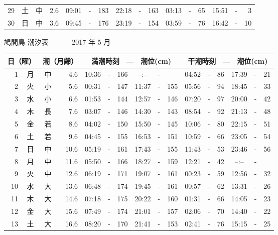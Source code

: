 \documentclass[12pt.a4j]{jsarticle}
\begin{document}
\begin{center}
\begin{table}[ht]
\begin{tabular}{|rc|cr|ccrccr|ccrccr|}
29 & 土 & 中 &  2.6 &  09:01 &-& 183  &  22:18 &-& 163  &   03:13 &-&  65  &   15:51 &-&   3  \\
30 & 日 & 中 &  3.6 &  09:45 &-& 176  &  23:19 &-& 154  &   03:59 &-&  76  &   16:42 &-&  10  \\
   \hline
   \end{tabular}
\end{table}
\newpage
 {\LARGE 鳩間島  潮汐表　　　}
 {\large 2017 年  5 月}\\
 \begin{table}[ht]
    \begin{tabular}{|rc|cr|ccrccr|ccrccr|}
    \hline
    \multicolumn{2}{|c|}{日（曜）} & \multicolumn{2}{c|}{潮（月齢）} & \multicolumn{6}{c|}{満潮時刻　―　潮位(cm)} & \multicolumn{6}{c|}{干潮時刻　―　潮位(cm)} \\
 \hline
 1 & 月 & 中 &  4.6 &  10:36 &-& 166  &  --:-- &-&     &   04:52 &-&  86  &   17:39 &-&  21  \\
 2 & 火 & 小 &  5.6 &  00:31 &-& 147  &  11:37 &-& 155  &   05:56 &-&  94  &   18:45 &-&  33  \\
 3 & 水 & 小 &  6.6 &  01:53 &-& 144  &  12:57 &-& 146  &   07:20 &-&  97  &   20:00 &-&  42  \\
 4 & 木 & 長 &  7.6 &  03:07 &-& 146  &  14:30 &-& 143  &   08:54 &-&  92  &   21:13 &-&  48  \\
 5 & 金 & 若 &  8.6 &  04:02 &-& 150  &  15:50 &-& 145  &   10:06 &-&  80  &   22:15 &-&  51  \\
 6 & 土 & 若 &  9.6 &  04:45 &-& 155  &  16:53 &-& 151  &   10:59 &-&  66  &   23:05 &-&  54  \\
 7 & 日 & 中 & 10.6 &  05:19 &-& 161  &  17:43 &-& 155  &   11:43 &-&  53  &   23:46 &-&  56  \\
 8 & 月 & 中 & 11.6 &  05:50 &-& 166  &  18:27 &-& 159  &   12:21 &-&  42  &   --:-- &-&     \\
 9 & 火 & 中 & 12.6 &  06:19 &-& 171  &  19:07 &-& 161  &   00:23 &-&  59  &   12:56 &-&  32  \\
10 & 水 & 大 & 13.6 &  06:48 &-& 174  &  19:45 &-& 161  &   00:57 &-&  62  &   13:31 &-&  26  \\
11 & 木 & 大 & 14.6 &  07:18 &-& 175  &  20:22 &-& 160  &   01:31 &-&  66  &   14:05 &-&  23  \\
12 & 金 & 大 & 15.6 &  07:49 &-& 174  &  21:01 &-& 157  &   02:06 &-&  70  &   14:40 &-&  22  \\
13 & 土 & 大 & 16.6 &  08:20 &-& 170  &  21:41 &-& 153  &   02:41 &-&  76  &   15:15 &-&  25  \\

\end{tabular}
\end{table}
\end{center}
\end{document}
